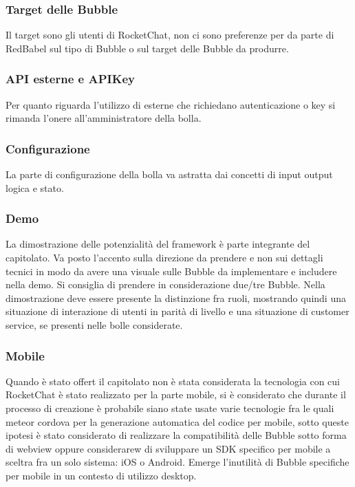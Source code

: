 \subsubsection{Target delle Bubble}
Il target sono gli utenti di RocketChat, non ci sono preferenze per da parte di RedBabel sul tipo di Bubble o sul target delle Bubble da produrre. 

\subsubsection{API esterne e APIKey}
Per quanto riguarda l’utilizzo di  esterne che richiedano autenticazione o key si rimanda l’onere all’amministratore della bolla.

\subsubsection{Configurazione}
La parte di configurazione della bolla va astratta dai concetti di input output logica e stato.

\subsubsection{Demo}
La dimostrazione delle potenzialità del framework è parte integrante del capitolato.
Va posto l’accento sulla direzione da prendere e non sui dettagli tecnici in modo da avere una visuale sulle Bubble da implementare e includere nella demo. Si consiglia di prendere in considerazione due/tre Bubble.
Nella dimostrazione deve essere presente la distinzione fra ruoli, mostrando quindi una situazione di interazione di utenti in parità di livello e una situazione di customer service, se presenti nelle bolle considerate. 

\subsubsection{Mobile}
Quando è stato offert il capitolato non è stata considerata la tecnologia con cui RocketChat è stato realizzato per la parte mobile, si è considerato che durante il processo di creazione è probabile siano state usate varie tecnologie fra le quali meteor cordova per la generazione automatica del codice per mobile, sotto queste ipotesi è stato considerato di realizzare la compatibilità delle Bubble sotto forma di webview oppure considerarew di sviluppare un SDK specifico per mobile a sceltra fra un solo sistema: iOS o Android.  
Emerge l’inutilità di Bubble specifiche per mobile in un contesto di utilizzo desktop.

\clearpage